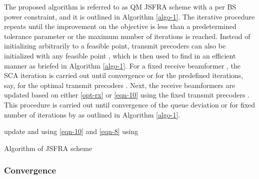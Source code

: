 The proposed algorithm is referred to as \acl{QM} \ac{JSFRA} scheme with a per \ac{BS} power constraint, and it is outlined in Algorithm \ref{algo-1}. The iterative procedure repeats until the improvement on the objective is less than a predetermined tolerance parameter or the maximum number of iterations is reached. Instead of initializing  arbitrarily to a feasible point, transmit precoders can also be initialized with any feasible point , which is then used to find  in an efficient manner as briefed in Algorithm \ref{algo-1}. For a fixed receive beamformer , the \ac{SCA} iteration is carried out until convergence or for the predefined iterations, say,  for the optimal transmit precoders . Next, the receive beamformers are updated based on either \eqref{opt-rx} or \eqref{eqn-10} using the fixed transmit precoders . This procedure is carried out until convergence of the queue deviation or for fixed number of iterations by  as outlined in Algorithm \ref{algo-1}.
{\allowdisplaybreaks
\begin{algorithm}
 \SetAlgoLined
 \DontPrintSemicolon
 \BlankLine
 update  and  using \eqref{eqn-10} and \eqref{eqn-8} using \;
 \caption{Algorithm of \acs{JSFRA} scheme}
 \label{algo-1}
\end{algorithm}
}
\subsubsection*{Convergence}

